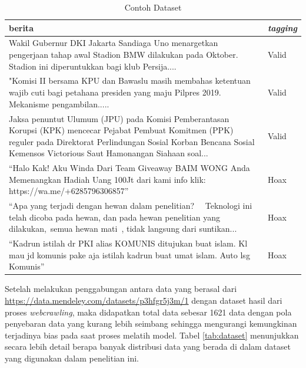 \begin{table}
  \caption{Contoh Dataset}
  \label{tab:contoh_dataset}
  \centering
  \begin{tabular}{ | p{.7\linewidth} | l | }
    \hline
    \textbf{berita}                                                                                                                                                                                                                   & \textbf{\textit{tagging}} \\ \hline
    Wakil Gubernur DKI Jakarta Sandiaga Uno menargetkan pengerjaan tahap awal Stadion BMW dilakukan pada Oktober. Stadion ini diperuntukkan bagi klub Persija....                                                                     & Valid                     \\ \hline
    "Komisi II bersama KPU dan Bawaslu masih membahas ketentuan wajib cuti bagi petahana presiden yang maju Pilpres 2019. Mekanisme pengambilan.....                                                                                  & Valid                     \\ \hline
    Jaksa penuntut Ulumum (JPU) pada Komisi Pemberantasan Korupsi (KPK) mencecar Pejabat Pembuat Komitmen (PPK) reguler pada Direktorat Perlindungan Sosial Korban Bencana Sosial Kemensos Victorious Saut Hamonangan Siahaan soal... & Valid                     \\ \hline
    “Halo Kak! Aku Winda Dari Team Giveaway BAIM WONG Anda Memenangkan Hadiah Uang 100Jt dari kami info klik: https://wa.me/+6285796306857”                                                                                           & Hoax                      \\ \hline
    “Apa yang terjadi dengan hewan dalam penelitian?   Teknologi ini telah dicoba pada hewan, dan pada hewan penelitian yang dilakukan, semua hewan mati , tidak langsung dari suntikan...                                            & Hoax                      \\ \hline
    “Kadrun istilah dr PKI alias KOMUNIS ditujukan buat islam. Kl mau jd komunis pake aja istilah kadrun buat umat islam. Auto lsg Komunis”                                                                                           & Hoax                      \\ \hline
  \end{tabular}
\end{table}

Setelah melakukan penggabungan antara data yang berasal dari \url{https://data.mendeley.com/datasets/p3hfgr5j3m/1} dengan dataset hasil dari proses \textit{webcrawling}, maka didapatkan total data sebesar 1621 data dengan pola penyebaran data yang kurang lebih seimbang sehingga mengurangi kemungkinan terjadinya bias pada saat proses melatih model. Tabel \ref{tab:dataset} menunjukkan secara lebih detail berapa banyak distribusi  data yang berada di dalam dataset yang digunakan dalam penelitian ini.

